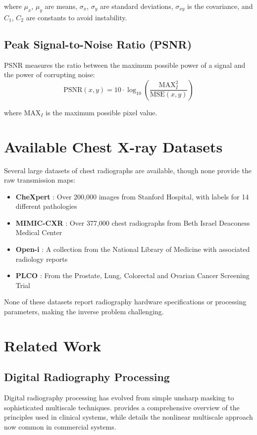 \documentclass[nomenclature, english, bibtex]{kththesis}
\numberwithin{listing}{chapter}
\begin{document}
where $\mu_x$, $\mu_y$ are means, $\sigma_x$, $\sigma_y$ are standard deviations, $\sigma_{xy}$ is the covariance, and $C_1$, $C_2$ are constants to avoid instability.

\subsection{Peak Signal-to-Noise Ratio (PSNR)}
PSNR measures the ratio between the maximum possible power of a signal and the power of corrupting noise:
\begin{equation}
\text{PSNR}(x, y) = 10 \cdot \log_{10}\left(\frac{\text{MAX}_I^2}{\text{MSE}(x, y)}\right)
\end{equation}

where $\text{MAX}_I$ is the maximum possible pixel value.

\section{Available Chest X-ray Datasets}
Several large datasets of chest radiographs are available, though none provide the raw transmission maps:
\begin{itemize}
    \item \textbf{CheXpert} \cite{irvin2019chexpert}: Over 200,000 images from Stanford Hospital, with labels for 14 different pathologies
    \item \textbf{MIMIC-CXR} \cite{johnson2019mimic}: Over 377,000 chest radiographs from Beth Israel Deaconess Medical Center
    \item \textbf{Open-i} \cite{demner2016preparing}: A collection from the National Library of Medicine with associated radiology reports

    \item \textbf{PLCO} \cite{gohagan2000prostate}: From the Prostate, Lung, Colorectal and Ovarian Cancer Screening Trial
\end{itemize}

None of these datasets report radiography hardware specifications or processing parameters, making the inverse problem challenging.

\section{Related Work}
\subsection{Digital Radiography Processing}
Digital radiography processing has evolved from simple unsharp masking to sophisticated multiscale techniques. \cite{prokop2003principles} provides a comprehensive overview of the principles used in clinical systems, while \cite{stahl2000digital} details the nonlinear multiscale approach now common in commercial systems.
\end{document}
